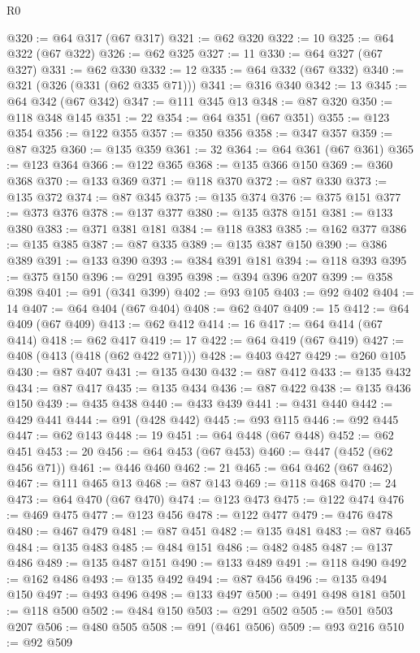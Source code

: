 \begin{lexlean}{R0}
\begin{coremodule}
@320 := @64 @317 (@67 @317)
@321 := @62 @320
@322 := 10
@325 := @64 @322 (@67 @322)
@326 := @62 @325
@327 := 11
@330 := @64 @327 (@67 @327)
@331 := @62 @330
@332 := 12
@335 := @64 @332 (@67 @332)
@340 := @321 (@326 (@331 (@62 @335 @71)))
@341 := @316 @340
@342 := 13
@345 := @64 @342 (@67 @342)
@347 := @111 @345 @13
@348 := @87 @320
@350 := @118 @348 @145
@351 := 22
@354 := @64 @351 (@67 @351)
@355 := @123 @354
@356 := @122 @355
@357 := @350 @356
@358 := @347 @357
@359 := @87 @325
@360 := @135 @359
@361 := 32
@364 := @64 @361 (@67 @361)
@365 := @123 @364
@366 := @122 @365
@368 := @135 @366 @150
@369 := @360 @368
@370 := @133 @369
@371 := @118 @370
@372 := @87 @330
@373 := @135 @372
@374 := @87 @345
@375 := @135 @374
@376 := @375 @151
@377 := @373 @376
@378 := @137 @377
@380 := @135 @378 @151
@381 := @133 @380
@383 := @371 @381 @181
@384 := @118 @383
@385 := @162 @377
@386 := @135 @385
@387 := @87 @335
@389 := @135 @387 @150
@390 := @386 @389
@391 := @133 @390
@393 := @384 @391 @181
@394 := @118 @393
@395 := @375 @150
@396 := @291 @395
@398 := @394 @396 @207
@399 := @358 @398
@401 := @91 (@341 @399)
@402 := @93 @105
@403 := @92 @402
@404 := 14
@407 := @64 @404 (@67 @404)
@408 := @62 @407
@409 := 15
@412 := @64 @409 (@67 @409)
@413 := @62 @412
@414 := 16
@417 := @64 @414 (@67 @414)
@418 := @62 @417
@419 := 17
@422 := @64 @419 (@67 @419)
@427 := @408 (@413 (@418 (@62 @422 @71)))
@428 := @403 @427
@429 := @260 @105
@430 := @87 @407
@431 := @135 @430
@432 := @87 @412
@433 := @135 @432
@434 := @87 @417
@435 := @135 @434
@436 := @87 @422
@438 := @135 @436 @150
@439 := @435 @438
@440 := @433 @439
@441 := @431 @440
@442 := @429 @441
@444 := @91 (@428 @442)
@445 := @93 @115
@446 := @92 @445
@447 := @62 @143
@448 := 19
@451 := @64 @448 (@67 @448)
@452 := @62 @451
@453 := 20
@456 := @64 @453 (@67 @453)
@460 := @447 (@452 (@62 @456 @71))
@461 := @446 @460
@462 := 21
@465 := @64 @462 (@67 @462)
@467 := @111 @465 @13
@468 := @87 @143
@469 := @118 @468
@470 := 24
@473 := @64 @470 (@67 @470)
@474 := @123 @473
@475 := @122 @474
@476 := @469 @475
@477 := @123 @456
@478 := @122 @477
@479 := @476 @478
@480 := @467 @479
@481 := @87 @451
@482 := @135 @481
@483 := @87 @465
@484 := @135 @483
@485 := @484 @151
@486 := @482 @485
@487 := @137 @486
@489 := @135 @487 @151
@490 := @133 @489
@491 := @118 @490
@492 := @162 @486
@493 := @135 @492
@494 := @87 @456
@496 := @135 @494 @150
@497 := @493 @496
@498 := @133 @497
@500 := @491 @498 @181
@501 := @118 @500
@502 := @484 @150
@503 := @291 @502
@505 := @501 @503 @207
@506 := @480 @505
@508 := @91 (@461 @506)
@509 := @93 @216
@510 := @92 @509

\end{coremodule}
\end{lexlean}
